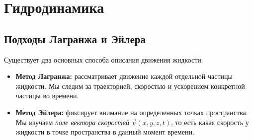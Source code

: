 \section{Гидродинамика}

\subsection{Подходы Лагранжа и Эйлера}
Существует два основных способа описания движения жидкости:
\begin{itemize}
    \item \textbf{Метод Лагранжа:} рассматривает движение каждой отдельной частицы жидкости. Мы следим за траекторией, скоростью и ускорением конкретной частицы во времени.
    \item \textbf{Метод Эйлера:} фиксирует внимание на определенных точках пространства. Мы изучаем \textit{поле вектора скоростей} $\vec{v}(x, y, z, t)$, то есть какая скорость у жидкости в точке пространства в данный момент времени. 
\end{itemize}

